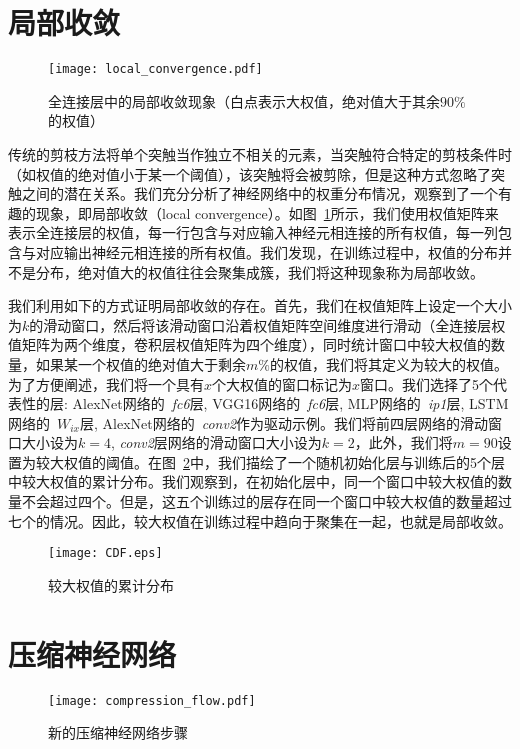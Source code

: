 \section{局部收敛}

\begin{figure}[h]
  \centering
  \texttt{[image: local\_convergence.pdf]}
  \caption{全连接层中的局部收敛现象（白点表示大权值，绝对值大于其余$90\%$的权值）}
  \label{fig:local_convergence}
\end{figure}

传统的剪枝方法将单个突触当作独立不相关的元素，当突触符合特定的剪枝条件时（如权值的绝对值小于某一个阈值），该突触将会被剪除，但是这种方式忽略了突触之间的潜在关系。我们充分分析了神经网络中的权重分布情况，观察到了一个有趣的现象，即局部收敛（local convergence）。如图~\ref{fig:local_convergence}所示，我们使用权值矩阵来表示全连接层的权值，每一行包含与对应输入神经元相连接的所有权值，每一列包含与对应输出神经元相连接的所有权值。我们发现，在训练过程中，权值的分布并不是分布，绝对值大的权值往往会聚集成簇，我们将这种现象称为局部收敛。

我们利用如下的方式证明局部收敛的存在。首先，我们在权值矩阵上设定一个大小为$k$的滑动窗口，然后将该滑动窗口沿着权值矩阵空间维度进行滑动（全连接层权值矩阵为两个维度，卷积层权值矩阵为四个维度），同时统计窗口中较大权值的数量，如果某一个权值的绝对值大于剩余$m\%$的权值，我们将其定义为较大的权值。为了方便阐述，我们将一个具有$x$个大权值的窗口标记为$x$窗口。我们选择了5个代表性的层: AlexNet网络的~\emph{fc6}层, VGG16网络的~\emph{fc6}层, MLP网络的~\emph{ip1}层, LSTM网络的~\emph{$W_{ix}$}层, AlexNet网络的~\emph{conv2}作为驱动示例。我们将前四层网络的滑动窗口大小设为$k = 4$, \emph{conv2}层网络的滑动窗口大小设为$k = 2$，此外，我们将$m = 90$设置为较大权值的阈值。在图~\ref{fig:cdf}中，我们描绘了一个随机初始化层与训练后的5个层中较大权值的累计分布。我们观察到，在初始化层中，同一个窗口中较大权值的数量不会超过四个。但是，这五个训练过的层存在同一个窗口中较大权值的数量超过七个的情况。因此，较大权值在训练过程中趋向于聚集在一起，也就是局部收敛。

\begin{figure}[h]
\centering
\texttt{[image: CDF.eps]}
\caption{较大权值的累计分布}
\label{fig:cdf}
\end{figure}

\section{压缩神经网络}

\begin{figure}[h]
\centering
\texttt{[image: compression\_flow.pdf]}
\caption{新的压缩神经网络步骤}
\label{fig:compression_flow}
\end{figure}

